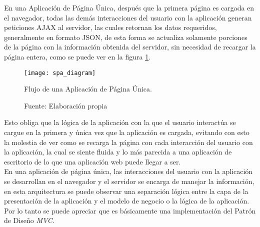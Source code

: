 En una Aplicación de Página Única, después que la primera página es cargada en el navegador, todas las demás interacciones del usuario con la aplicación generan peticiones AJAX al servidor, las cuales retornan los datos requeridos, generalmente en formato JSON, de esta forma se actualiza solamente porciones de la página con la información obtenida del servidor, sin necesidad de recargar la página entera, como se puede ver en la figura \ref{fig:spa_diagram}. \\


\begin{figure}[H]
  \begin{center}
    \texttt{[image: spa\_diagram]}
    \caption{Flujo de una Aplicación de Página Única.}
    \label{fig:spa_diagram}
    \caption*{Fuente: Elaboración propia}
  \end{center}
\end{figure}


Esto obliga que la lógica de la aplicación con la que el usuario interactúa se cargue en la primera y única vez que la aplicación es cargada, evitando con esto la molestia de ver como se recarga la página con cada interacción del usuario con la aplicación, la cual se siente fluida y lo más parecida a una aplicación de escritorio de lo que una aplicación web puede llegar a ser.\\




%

En una aplicación de página única, las interacciones del usuario con la aplicación se desarrollan en el navegador y el servidor se encarga de manejar la información, en esta arquitectura se puede observar una separación lógica entre la capa de la presentación de la aplicación y el modelo de negocio o la lógica de la aplicación. Por lo tanto se puede apreciar que es básicamente una implementación del Patrón de Diseño \emph{MVC}.\\


